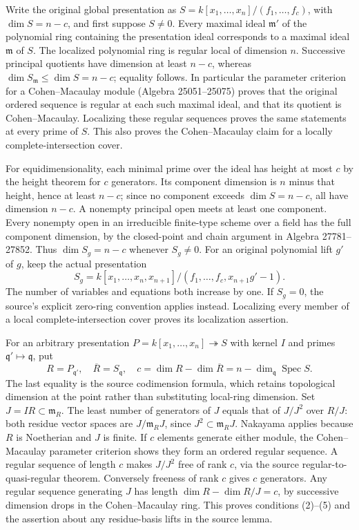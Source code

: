Write the original global presentation as \(S=k[x_1,\ldots,x_n]/(f_1,\ldots,f_c)\), with \(\dim S=n-c\), and first suppose \(S\ne0\). Every maximal ideal \(\mathfrak m'\) of the polynomial ring containing the presentation ideal corresponds to a maximal ideal \(\mathfrak m\) of \(S\). The localized polynomial ring is regular local of dimension \(n\). Successive principal quotients have dimension at least \(n-c\), whereas \(\dim S_{\mathfrak m}\leq\dim S=n-c\); equality follows. In particular the parameter criterion for a Cohen--Macaulay module (Algebra 25051--25075) proves that the original ordered sequence is regular at each such maximal ideal, and that its quotient is Cohen--Macaulay. Localizing these regular sequences proves the same statements at every prime of \(S\). This also proves the Cohen--Macaulay claim for a locally complete-intersection cover.

For equidimensionality, each minimal prime over the ideal has height at most \(c\) by the height theorem for \(c\) generators. Its component dimension is \(n\) minus that height, hence at least \(n-c\); since no component exceeds \(\dim S=n-c\), all have dimension \(n-c\). A nonempty principal open meets at least one component. Every nonempty open in an irreducible finite-type scheme over a field has the full component dimension, by the closed-point and chain argument in Algebra 27781--27852. Thus \(\dim S_g=n-c\) whenever \(S_g\ne0\). For an original polynomial lift \(g'\) of \(g\), keep the actual presentation \[
S_g=k[x_1,\ldots,x_n,x_{n+1}]/(f_1,\ldots,f_c,x_{n+1}g'-1).
\] The number of variables and equations both increase by one. If \(S_g=0\), the source's explicit zero-ring convention applies instead. Localizing every member of a local complete-intersection cover proves its localization assertion.

For an arbitrary presentation \(P=k[x_1,\ldots,x_n]\twoheadrightarrow S\) with kernel \(I\) and primes \(\mathfrak q'\mapsto\mathfrak q\), put \[
R=P_{\mathfrak q'},\quad \overline R=S_{\mathfrak q},\quad
c=\dim R-\dim\overline R=n-\dim_{\mathfrak q}\operatorname{Spec}S.
\] The last equality is the source codimension formula, which retains topological dimension at the point rather than substituting local-ring dimension. Set \(J=IR\subset\mathfrak m_R\). The least number of generators of \(J\) equals that of \(J/J^2\) over \(R/J\): both residue vector spaces are \(J/\mathfrak m_RJ\), since \(J^2\subset\mathfrak m_RJ\). Nakayama applies because \(R\) is Noetherian and \(J\) is finite. If \(c\) elements generate either module, the Cohen--Macaulay parameter criterion shows they form an ordered regular sequence. A regular sequence of length \(c\) makes \(J/J^2\) free of rank \(c\), via the source regular-to-quasi-regular theorem. Conversely freeness of rank \(c\) gives \(c\) generators. Any regular sequence generating \(J\) has length \(\dim R-\dim R/J=c\), by successive dimension drops in the Cohen--Macaulay ring. This proves conditions (2)--(5) and the assertion about any residue-basis lifts in the source lemma.

